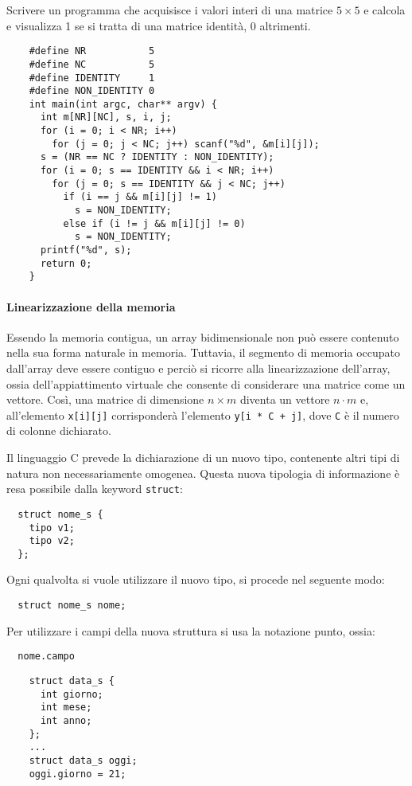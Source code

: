 \begin{example}
  Scrivere un programma che acquisisce i valori interi di una matrice $5\times 5$ e calcola e visualizza 1 se si tratta di una matrice identità, 0 altrimenti.
  \begin{verbatim}
    #define NR           5
    #define NC           5
    #define IDENTITY     1
    #define NON_IDENTITY 0
    int main(int argc, char** argv) {
      int m[NR][NC], s, i, j;
      for (i = 0; i < NR; i++)
        for (j = 0; j < NC; j++) scanf("%d", &m[i][j]);
      s = (NR == NC ? IDENTITY : NON_IDENTITY);
      for (i = 0; s == IDENTITY && i < NR; i++)
        for (j = 0; s == IDENTITY && j < NC; j++)
          if (i == j && m[i][j] != 1)
            s = NON_IDENTITY;
          else if (i != j && m[i][j] != 0)
            s = NON_IDENTITY;
      printf("%d", s);
      return 0;
    }\end{verbatim}
\end{example}

\paragraph*{Linearizzazione della memoria}

Essendo la memoria contigua, un array bidimensionale non può essere contenuto nella sua forma naturale in memoria. Tuttavia, il segmento di memoria occupato dall'array deve essere contiguo e perciò si ricorre alla linearizzazione dell'array, ossia dell'appiattimento virtuale che consente di considerare una matrice come un vettore. Così, una matrice di dimensione $n\times m$ diventa un vettore $n\cdot m$ e, all'elemento \verb|x[i][j]| corrisponderà l'elemento \verb|y[i * C + j]|, dove \verb|C| è il numero di colonne dichiarato.

Il linguaggio C prevede la dichiarazione di un nuovo tipo, contenente altri tipi di natura non necessariamente omogenea. Questa nuova tipologia di informazione è resa possibile dalla keyword \verb|struct|:
\begin{verbatim}
  struct nome_s {
    tipo v1;
    tipo v2;
  };
\end{verbatim}
Ogni qualvolta si vuole utilizzare il nuovo tipo, si procede nel seguente modo:
\begin{verbatim}
  struct nome_s nome;
\end{verbatim}
Per utilizzare i campi della nuova struttura si usa la notazione punto, ossia:
\begin{verbatim}
  nome.campo
\end{verbatim}
\begin{example}
  \begin{verbatim}
    struct data_s {
      int giorno;
      int mese;
      int anno;
    };
    ...
    struct data_s oggi;
    oggi.giorno = 21;
  \end{verbatim}
\end{example}

